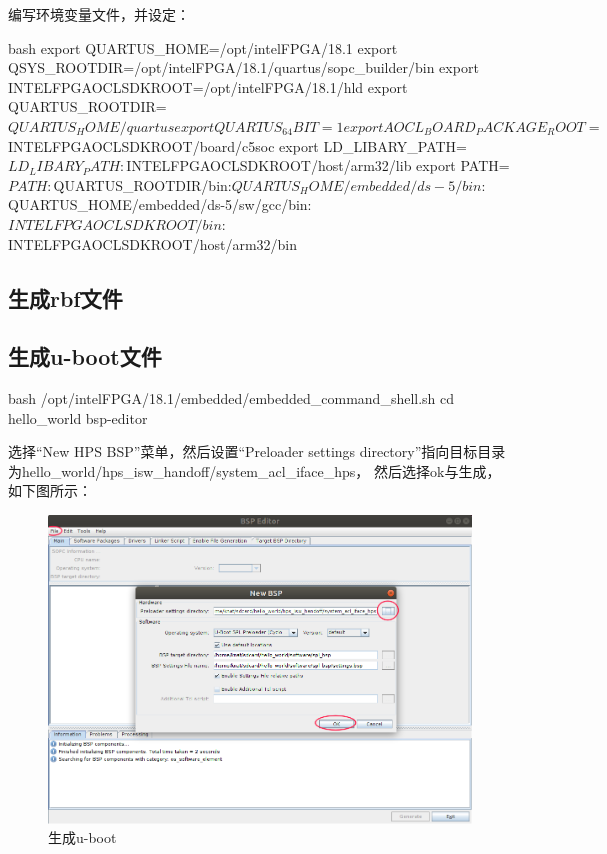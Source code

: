 编写环境变量文件，并设定：
\begin{code-block}{bash}
export QUARTUS_HOME=/opt/intelFPGA/18.1
export QSYS_ROOTDIR=/opt/intelFPGA/18.1/quartus/sopc_builder/bin
export INTELFPGAOCLSDKROOT=/opt/intelFPGA/18.1/hld
export QUARTUS_ROOTDIR=$QUARTUS_HOME/quartus
export QUARTUS_64BIT=1
export AOCL_BOARD_PACKAGE_ROOT=$INTELFPGAOCLSDKROOT/board/c5soc
export LD_LIBARY_PATH=$LD_LIBARY_PATH:$INTELFPGAOCLSDKROOT/host/arm32/lib
export PATH=$PATH:$QUARTUS_ROOTDIR/bin:$QUARTUS_HOME/embedded/ds-5/bin:$QUARTUS_HOME/embedded/ds-5/sw/gcc/bin:$INTELFPGAOCLSDKROOT/bin:$INTELFPGAOCLSDKROOT/host/arm32/bin
\end{code-block}

\subsection{生成rbf文件}

\subsection{生成u-boot文件}
\begin{code-block}{bash}
/opt/intelFPGA/18.1/embedded/embedded_command_shell.sh
cd hello_world
bsp-editor
\end{code-block}
选择“New HPS BSP”菜单，然后设置“Preloader settings directory”指向目标目录为hello\_world/hps\_isw\_handoff/system\_acl\_iface\_hps，
然后选择ok与生成，如下图所示：
\begin{figure}[H]
  \centering
  \includegraphics[width=\linewidth]{bsp.png}
  \caption{生成u-boot}
  \label{fig:bsp}
\end{figure}

